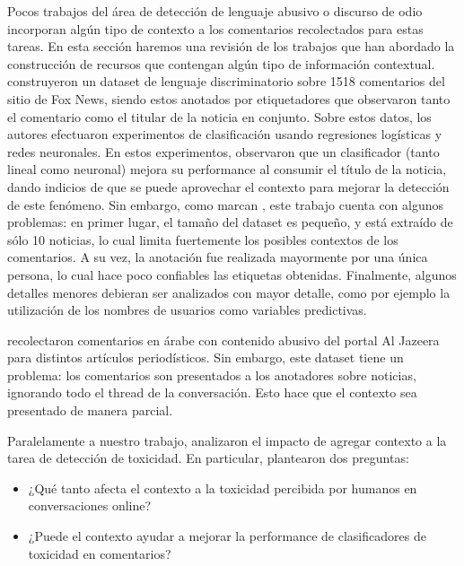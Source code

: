Pocos trabajos del área de detección de lenguaje abusivo o discurso de odio incorporan algún tipo de contexto a los comentarios recolectados para estas tareas. En esta sección haremos una revisión de los trabajos que han abordado la construcción de recursos que contengan algún tipo de información contextual. \citet{gao-huang-2017-detecting} construyeron un dataset de lenguaje discriminatorio sobre 1518 comentarios del sitio de Fox News, siendo estos anotados por etiquetadores que observaron tanto el comentario como el titular de la noticia en conjunto. Sobre estos datos, los autores efectuaron experimentos de clasificación usando regresiones logísticas y redes neuronales. En estos experimentos, observaron que un clasificador (tanto lineal como neuronal) mejora su performance al consumir el título de la noticia, dando indicios de que se puede aprovechar el contexto para mejorar la detección de este fenómeno. Sin embargo, como marcan \citet{pavlopoulos2020toxicity}, este trabajo cuenta con algunos problemas: en primer lugar, el tamaño del dataset es pequeño, y está extraído de sólo 10 noticias, lo cual limita fuertemente los posibles contextos de los comentarios. A su vez, la anotación fue realizada mayormente por una única persona, lo cual hace poco confiables las etiquetas obtenidas. Finalmente, algunos detalles menores debieran ser analizados con mayor detalle, como por ejemplo la utilización de los nombres de usuarios como variables predictivas.

\citet{mubarak-etal-2017-abusive} recolectaron comentarios en árabe con contenido abusivo del portal Al Jazeera para distintos artículos periodísticos. Sin embargo, este dataset tiene un problema: los comentarios son presentados a los anotadores sobre noticias, ignorando todo el thread de la conversación. Esto hace que el contexto sea presentado de manera parcial.

Paralelamente a nuestro trabajo, \citet{pavlopoulos2020toxicity} analizaron el impacto de agregar contexto a la tarea de detección de toxicidad. En particular, plantearon dos preguntas:

\begin{itemize}
    \item ¿Qué tanto afecta el contexto a la toxicidad percibida por humanos en conversaciones online?
    \item ¿Puede el contexto ayudar a mejorar la performance de clasificadores de toxicidad en comentarios?
\end{itemize}

